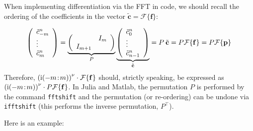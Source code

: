\documentclass[12pt,a4paper]{article}
\begin{document}
When implementing differentiation via the FFT in code, we should recall the ordering of the coefficients in the vector $\tilde{\mathbf{c}} = \mathcal{F}\lbrace \mathbf{f}  \rbrace$:

\[
\left(
\begin{array}{l}
\tilde{c}^n_{-m} \\
\vdots \\
\tilde{c}^n_{m}
\end{array}
\right) = 
\underbrace{\left(
\begin{array}{c c}
   & I_{m} \\
I_{m+1} & 
\end{array}
\right)}_{P}
\underbrace{\left(
\begin{array}{l}
\tilde{c}^n_{0} \\
\vdots \\
\tilde{c}^n_{n-1}
\end{array}
\right)}_{\tilde{\mathbf{c}}} = P\: \tilde{\mathbf{c}} = P\mathcal{F}\lbrace \mathbf{f}  \rbrace = P\mathcal{F}\lbrace \mathbf{p}\rbrace
\]
Therefore, $\left({\rm i}(-m\!:\!m)\right)^{\nu}\cdot\mathcal{F}\lbrace  \mathbf{f} \rbrace$ should, strictly speaking, be expressed as $\left({\rm i}(-m\!:\!m)\right)^{\nu}\cdot P\mathcal{F}\lbrace  \mathbf{f} \rbrace$.  In Julia and Matlab, the permutation $P$ is performed by the command \texttt{fftshift} and the permutation (or re-ordering) can be undone via \texttt{ifftshift} (this performs the inverse permutation, $P^{\top}$).

Here is an example:
\end{document}
